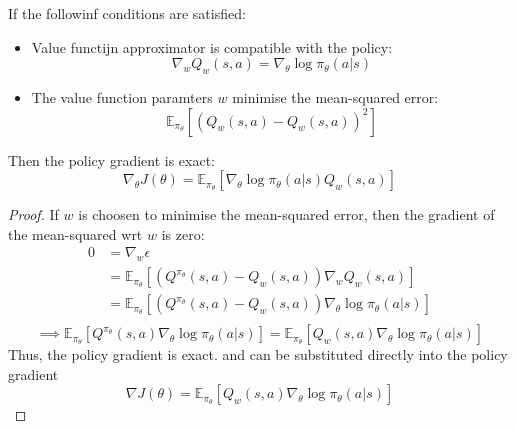 \begin{theorem}
If the followinf conditions are satisfied:
\begin{itemize}
    \item Value functijn approximator is compatible with the policy:
    \[
        \nabla_w Q_w(s,a) = \nabla_\theta \log \pi_\theta(a|s)        
    \]
    \item The value function paramters \(w\) minimise the mean-squared error:
    \[
        \mathbb{E}_{\pi_\theta} \left[ 
            \left( Q_w(s,a) - Q_w(s,a) \right)^2
        \right]
    \]
\end{itemize}
Then the policy gradient is exact:
\[
    \nabla_\theta J(\theta) = \mathbb{E}_{\pi_\theta} \left[ 
        \nabla_\theta \log \pi_\theta(a|s) Q_w(s,a)
    \right]
\]
\end{theorem}
\begin{proof}
    If \(w\) is choosen to minimise the mean-squared error, then the gradient of the mean-squared
    wrt \(w\) is zero:
    \[
        \begin{aligned}
            0 &= \nabla _w \epsilon \\
            &= \mathbb{E} _{\pi_\theta} \left[ 
                (Q^{\pi_\theta}(s,a) - Q_w(s,a)) \nabla_w Q_w(s,a)
            \right] \\
            &= \mathbb{E} _{\pi_\theta} \left[ 
                (Q^{\pi_\theta}(s,a) - Q_w(s,a)) \nabla_\theta \log \pi_\theta(a|s)
            \right] \\
        \end{aligned}
    \]
    \[
        \implies \mathbb{E} _{\pi_\theta} \left[ 
            Q^{\pi_\theta}(s,a) \nabla_\theta \log \pi_\theta(a|s)
        \right] = \mathbb{E} _{\pi_\theta} \left[
            Q_w(s,a) \nabla_\theta \log \pi_\theta(a|s)
        \right]
    \]
    Thus, the policy gradient is exact. and can be substituted directly into the policy gradient
    \[
        \nabla J(\theta) = \mathbb{E} _{\pi_\theta} \left[ 
            Q_w(s,a) \nabla_\theta \log \pi_\theta(a|s)
        \right]
    \]
\end{proof}



